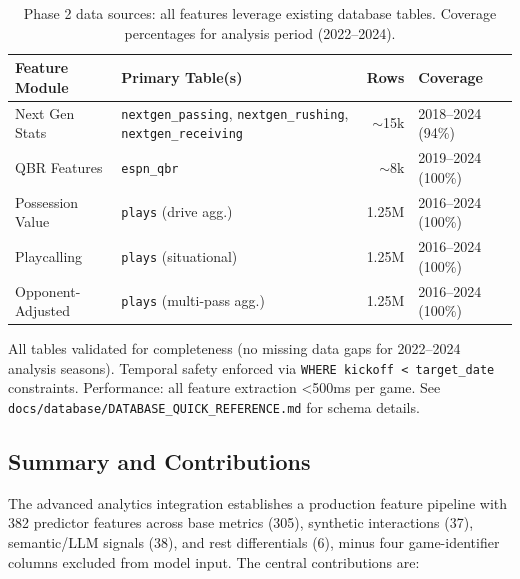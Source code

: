 \begin{table}[t]
  \centering
  \footnotesize
  \begin{threeparttable}
    \caption{Phase 2 data sources: all features leverage existing database tables. Coverage percentages for analysis period (2022--2024).}
    \label{tab:phase2-data-sources}
    \begin{tabular}{@{} l p{4.5cm} r l @{}}
      \toprule
      \textbf{Feature Module} & \textbf{Primary Table(s)} & \textbf{Rows} & \textbf{Coverage} \\
      \midrule
      Next Gen Stats & \texttt{nextgen\_passing}, \texttt{nextgen\_rushing}, \texttt{nextgen\_receiving} & $\sim$15k & 2018--2024 (94\%) \\
      QBR Features & \texttt{espn\_qbr} & $\sim$8k & 2019--2024 (100\%) \\
      Possession Value & \texttt{plays} (drive agg.) & 1.25M & 2016--2024 (100\%) \\
      Playcalling & \texttt{plays} (situational) & 1.25M & 2016--2024 (100\%) \\
      Opponent-Adjusted & \texttt{plays} (multi-pass agg.) & 1.25M & 2016--2024 (100\%) \\
      \bottomrule
    \end{tabular}
    \begin{tablenotes}[flushleft]\footnotesize
      \item All tables validated for completeness (no missing data gaps for 2022--2024 analysis seasons). Temporal safety enforced via \texttt{WHERE kickoff <\ target\_date} constraints. Performance: all feature extraction <500ms per game. See \texttt{docs/database/\allowbreak DATABASE\_QUICK\_REFERENCE.md} for schema details.
    \end{tablenotes}
  \end{threeparttable}
\end{table}

\subsection{Summary and Contributions}
\label{subsec:phase2-summary}

The advanced analytics integration establishes a production feature pipeline with 382 predictor features across base metrics (305), synthetic interactions (37), semantic/LLM signals (38), and rest differentials (6), minus four game-identifier columns excluded from model input. The central contributions are:

